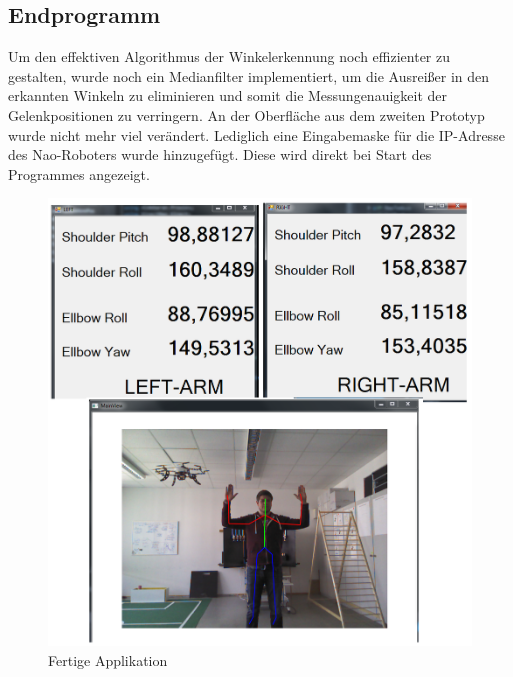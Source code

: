 \subsection{Endprogramm}
Um den effektiven Algorithmus der Winkelerkennung noch effizienter zu gestalten, wurde noch ein Medianfilter implementiert, um die Ausreißer in den erkannten Winkeln zu eliminieren und somit die Messungenauigkeit der Gelenkpositionen zu verringern.
\newline
An der Oberfläche aus dem zweiten Prototyp wurde nicht mehr viel verändert. Lediglich eine Eingabemaske für die IP-Adresse des Nao-Roboters wurde hinzugefügt. Diese wird direkt bei Start des Programmes angezeigt.

\begin{figure}[H]						
	\centering							
	\includegraphics[scale=0.4]{Bilder/Programm.png}
	\caption{Fertige Applikation}						
	\label{f:programm}						
\end{figure}


